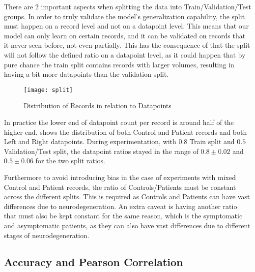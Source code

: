 There are 2 important aspects when splitting the data into Train/Validation/Test groups. In order to truly validate the model's generalization capability, the split must happen on a record level and not on a datapoint level. This means that our model can only learn on certain records, and it can be validated on records that it never seen before, not even partially. This has the consequence of that the split will not follow the defined ratio on a datapoint level, as it could happen that by pure chance the train split contains records with larger volumes, resulting in having a bit more datapoints than the validation split.
\begin{figure}[H]
\centering
\texttt{[image: split]}
\caption{Distribution of Records in relation to Datapoints}
\label{fig:hist_split}
\end{figure}
In practice the lower end of datapoint count per record is around half of the higher end.  shows the distribution of both Control and Patient records and both Left and Right datapoints. During experimentation, with $0.8$ Train split and $0.5$ Validation/Test split, the datapoint ratios stayed in the range of $0.8\pm0.02$ and $0.5\pm0.06$ for the two split ratios.\par
Furthermore to avoid introducing bias in the case of experiments with mixed Control and Patient records, the ratio of Controls/Patients must be constant across the different splits. This is required as Controls and Patients can have vast differences due to neurodegeneration. An extra caveat is having another ratio that must also be kept constant for the same reason, which is the symptomatic and asymptomatic patients, as they can also have vast differences due to different stages of neurodegeneration.

\subsection{Accuracy and Pearson Correlation}

